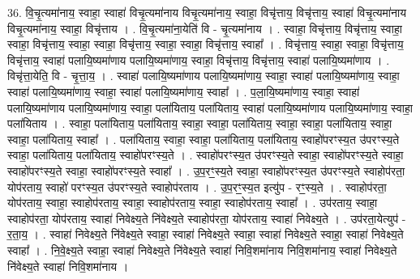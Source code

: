 \documentclass[17pt]{extarticle}
\begin{document}
36. वि॒चृ॒त्यमा॑नाय॒ स्वाहा॒ स्वाहा॑ विचृ॒त्यमा॑नाय विचृ॒त्यमा॑नाय॒ स्वाहा॒ विचृ॑त्ताय॒ विचृ॑त्ताय॒ स्वाहा॑ विचृ॒त्यमा॑नाय विचृ॒त्यमा॑नाय॒ स्वाहा॒ विचृ॑त्ताय । . वि॒चृ॒त्यमा॑ना॒येति॑ वि - चृ॒त्यमा॑नाय । . स्वाहा॒ विचृ॑त्ताय॒ विचृ॑त्ताय॒ स्वाहा॒ स्वाहा॒ विचृ॑त्ताय॒ स्वाहा॒ स्वाहा॒ विचृ॑त्ताय॒ स्वाहा॒ स्वाहा॒ विचृ॑त्ताय॒ स्वाहा᳚ । . विचृ॑त्ताय॒ स्वाहा॒ स्वाहा॒ विचृ॑त्ताय॒ विचृ॑त्ताय॒ स्वाहा॑ पलायि॒ष्यमा॑णाय पलायि॒ष्यमा॑णाय॒ स्वाहा॒ विचृ॑त्ताय॒ विचृ॑त्ताय॒ स्वाहा॑ पलायि॒ष्यमा॑णाय । . विचृ॑त्ता॒येति॒ वि - चृ॒त्ता॒य॒ । . स्वाहा॑ पलायि॒ष्यमा॑णाय पलायि॒ष्यमा॑णाय॒ स्वाहा॒ स्वाहा॑ पलायि॒ष्यमा॑णाय॒ स्वाहा॒ स्वाहा॑ पलायि॒ष्यमा॑णाय॒ स्वाहा॒ स्वाहा॑ पलायि॒ष्यमा॑णाय॒ स्वाहा᳚ । . प॒ला॒यि॒ष्यमा॑णाय॒ स्वाहा॒ स्वाहा॑ पलायि॒ष्यमा॑णाय पलायि॒ष्यमा॑णाय॒ स्वाहा॒ पला॑यिताय॒ पला॑यिताय॒ स्वाहा॑ पलायि॒ष्यमा॑णाय पलायि॒ष्यमा॑णाय॒ स्वाहा॒ पला॑यिताय । . स्वाहा॒ पला॑यिताय॒ पला॑यिताय॒ स्वाहा॒ स्वाहा॒ पला॑यिताय॒ स्वाहा॒ स्वाहा॒ पला॑यिताय॒ स्वाहा॒ स्वाहा॒ पला॑यिताय॒ स्वाहा᳚ । . पला॑यिताय॒ स्वाहा॒ स्वाहा॒ पला॑यिताय॒ पला॑यिताय॒ स्वाहो॑परꣳस्य॒त उ॑परꣳस्य॒ते स्वाहा॒ पला॑यिताय॒ पला॑यिताय॒ स्वाहो॑परꣳस्य॒ते । . स्वाहो॑परꣳस्य॒त उ॑परꣳस्य॒ते स्वाहा॒ स्वाहो॑परꣳस्य॒ते स्वाहा॒ स्वाहो॑परꣳस्य॒ते स्वाहा॒ 
स्वाहो॑परꣳस्य॒ते स्वाहा᳚ । . उ॒प॒रꣳ॒॒स्य॒ते स्वाहा॒ स्वाहो॑परꣳस्य॒त उ॑परꣳस्य॒ते स्वाहोप॑रता॒ योप॑रताय॒ स्वाहो॑ परꣳस्य॒त उ॑परꣳस्य॒ते स्वाहोप॑रताय । . उ॒प॒रꣳ॒॒स्य॒त इत्यु॑प - रꣳ॒॒स्य॒ते । . स्वाहोप॑रता॒ योप॑रताय॒ स्वाहा॒ स्वाहोप॑रताय॒ स्वाहा॒ स्वाहोप॑रताय॒ स्वाहा॒ स्वाहोप॑रताय॒ स्वाहा᳚ । . उप॑रताय॒ स्वाहा॒ स्वाहोप॑रता॒ योप॑रताय॒ स्वाहा॑ निवेक्ष्य॒ते नि॑वेक्ष्य॒ते स्वाहोप॑रता॒ योप॑रताय॒ स्वाहा॑ निवेक्ष्य॒ते । . उप॑रता॒येत्युप॑ - र॒ता॒य॒ । . स्वाहा॑ निवेक्ष्य॒ते नि॑वेक्ष्य॒ते स्वाहा॒ स्वाहा॑ निवेक्ष्य॒ते स्वाहा॒ स्वाहा॑ निवेक्ष्य॒ते स्वाहा॒ स्वाहा॑ निवेक्ष्य॒ते स्वाहा᳚ । . नि॒वे॒क्ष्य॒ते स्वाहा॒ स्वाहा॑ निवेक्ष्य॒ते नि॑वेक्ष्य॒ते स्वाहा॑ निवि॒शमा॑नाय निवि॒शमा॑नाय॒ स्वाहा॑ निवेक्ष्य॒ते नि॑वेक्ष्य॒ते स्वाहा॑ निवि॒शमा॑नाय । \newline
\end{document}
